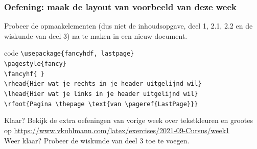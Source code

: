 \documentclass{beamer}
\begin{document}
\begin{frame}
	\frametitle{Oefening: maak de layout van voorbeeld van deze week}
	Probeer de opmaakelementen (dus niet de inhoudsopgave, deel 1, 2.1,  2.2 en de wiskunde van deel 3) na te maken in een nieuw document. \begin{block}{code}
	\texttt{\textbackslash usepackage\{fancyhdf, lastpage\}}\\
	\texttt{\textbackslash pagestyle\{fancy\}}\\
	\texttt{\textbackslash fancyhf\{ \}}\\
	\texttt{\textbackslash rhead\{{\textnormal{Hier wat je rechts in je header uitgelijnd wil}}\}}\\
	\texttt{\textbackslash lhead\{{\textnormal{Hier wat je links in je header uitgelijnd wil}}\}}\\
	\texttt{\textbackslash rfoot\{Pagina \textbackslash thepage \textbackslash text\{van \textbackslash pageref\{LastPage\}\}\} }
	\end{block}
	Klaar? Bekijk de extra oefeningen van vorige week over tekstkleuren en grootes op \url{https://www.vkuhlmann.com/latex/exercises/2021-09-Cursus/week1}\\
	Weer klaar? Probeer de wiskunde van deel 3 toe te voegen. %
	
\end{frame}
\end{document}

